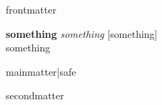 \documentclass[10pt,twoside]{book}
\begin{document}
    \frontmatter
    {{ frontmatter }}

    \mainmatter
    \pagestyle{fancy}

    \needspace{2cm}
    \begin{addmargin}[1.2em]{0em}
        \hspace{-1.2em}\textbf{something} {\textit{something}} [{something}]\\
        {something}\\
    \end{addmargin}
    \par\vspace{0.1em}

    {{ mainmatter|safe }}

    \newpage
    {{ secondmatter }}
\end{document}
